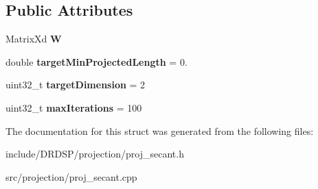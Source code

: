 \subsection*{Public Attributes}
\begin{DoxyCompactItemize}
\item 
\hypertarget{struct_d_r_d_s_p_1_1_proj_secant_a99ab0daf8cb539f9ecf07132d3994357}{Matrix\-Xd {\bfseries W}}\label{struct_d_r_d_s_p_1_1_proj_secant_a99ab0daf8cb539f9ecf07132d3994357}

\item 
\hypertarget{struct_d_r_d_s_p_1_1_proj_secant_a422dde54e49a8b5ab4f631fc0b8cf829}{double {\bfseries target\-Min\-Projected\-Length} = 0.}\label{struct_d_r_d_s_p_1_1_proj_secant_a422dde54e49a8b5ab4f631fc0b8cf829}

\item 
\hypertarget{struct_d_r_d_s_p_1_1_proj_secant_aa74d47b541db9bf256f9602e2ae0646a}{uint32\-\_\-t {\bfseries target\-Dimension} = 2}\label{struct_d_r_d_s_p_1_1_proj_secant_aa74d47b541db9bf256f9602e2ae0646a}

\item 
\hypertarget{struct_d_r_d_s_p_1_1_proj_secant_afa9954dc50be3af121c7590879782afa}{uint32\-\_\-t {\bfseries max\-Iterations} = 100}\label{struct_d_r_d_s_p_1_1_proj_secant_afa9954dc50be3af121c7590879782afa}

\end{DoxyCompactItemize}


The documentation for this struct was generated from the following files\-:\begin{DoxyCompactItemize}
\item 
include/\-D\-R\-D\-S\-P/projection/proj\-\_\-secant.\-h\item 
src/projection/proj\-\_\-secant.\-cpp\end{DoxyCompactItemize}
